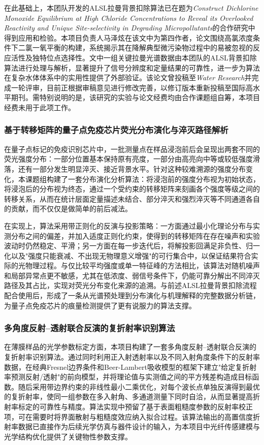 \documentclass[12pt,a4paper]{article}
\begin{document}
在此基础上，本团队开发的ALSL拉曼背景扣除算法已在题为\textit{Construct Dichlorine Monoxide Equilibrium at High Chloride Concentrations to Reveal its Overlooked Reactivity and Unique Site-selectivity in Degrading Micropollutants}的合作研究中得到应用和检验。本项目负责人马泽炫在该文中为第四作者，论文围绕高氯浓度条件下二氯一氧平衡的构建，系统揭示其在降解典型微污染物过程中的易被忽视的反应活性及独特位点选择性。文中一组关键拉曼光谱数据由本团队的ALSL背景扣除算法进行处理与解析，显著提升了信号分辨度和定量结果的可靠性，进一步为算法在复杂水体体系中的实用性提供了外部验证。该论文曾投稿至\textit{Water Research}并完成一轮评审，目前正根据审稿意见进行修改完善，以修订版本重新投稿至国际高水平期刊。需特别说明的是，该研究的实验与论文经费均由合作课题组自筹，本项目经费未用于此项工作。

\subsubsection{基于转移矩阵的量子点免疫芯片荧光分布演化与淬灭路径解析}

在量子点标记的免疫识别芯片中，一批测量点在样品浸泡前后会呈现出两套不同的荧光强度分布：一部分位置基本保持原有亮度，一部分由高亮向中等或较低强度滑落，还有一部分发生明显淬灭、接近背景水平。针对这种较难溯源的强度分布变化，本课题组构建了一套分布演化分析算法：将浸泡前的强度分布视为初始状态，将浸泡后的分布视为终态，通过一个受约束的转移矩阵来刻画各个强度等级之间的转移关系，从而在统计层面定量描述未结合、部分淬灭和强烈淬灭等不同通道各自的贡献，而不仅仅是做简单的前后减法。

在实现上，算法采用带正则化的反演与投影策略：一方面通过最小化理论分布与实测分布之间的偏差，并加入适度正则化约束，使得到的转移矩阵在存在噪声和实验波动时仍然稳定、平滑；另一方面在每一步迭代后，将解投影回满足非负性、归一化以及"强度只能衰减、不出现无物理意义增强"的可行集合中，以保证结果符合实际的光物理过程。与仅比较平均强度或单一特征峰的方法相比，该算法对随机噪声和局部异常点更不敏感，尤其在低浓度、弱信号条件下，仍能可靠分解出不同淬灭路径及其占比，实现对荧光分布变化来源的追溯。与前述ALSL拉曼背景扣除流程配合使用后，形成了一条从光谱预处理到分布演化与机理解释的完整数据分析链，为量子点免疫芯片的痕量检测提供了更有说服力的算法支撑。

\subsubsection{多角度反射--透射联合反演的复折射率识别算法}

在薄膜样品的光学参数标定方面，本项目构建了一套多角度反射--透射联合反演的复折射率识别算法。通过同时利用正入射透射率以及不同入射角度条件下的反射率数据，在经典Fresnel边界条件和Beer-Lambert吸收模型的框架下建立"给定复折射率预测反射/透射"的前向模型，并将理论值与实测值之间的平方残差构造成目标函数。随后采用带边界约束的非线性最小二乘优化，对每个波长点单独反演得到最优的复折射率，使同一组参数在多入射角、多通道测量下同时自洽，从而显著提高折射率标定的可靠性与精度。算法实现中预留了基于表面粗糙度参数的反射率校正项，可在需要时将界面散射与粗糙度效应纳入拟合过程。该算法输出的高置信度折射率数据已直接作为后续光学仿真与器件设计的输入，为本项目中光纤传感建模与光学结构优化提供了关键物性参数支撑。
\end{document}
